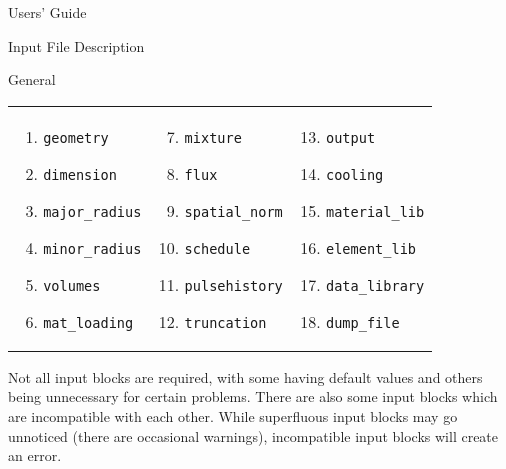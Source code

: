 \begin{chapter}{Users' Guide\label{app:user.guide}}
\begin{section}{Input File Description\label{app:user.input}}
\begin{subsection}{General}
      {
        \renewcommand{\baselinestretch}{1}\normalsize
        \noindent\begin{tabular}{p{2in}p{2in}p{2in}}
          \begin{enumerate}
          \item \texttt{geometry}
          \item \texttt{dimension}
          \item \texttt{major\_radius}
          \item \texttt{minor\_radius}
          \item \texttt{volumes}
          \item \texttt{mat\_loading}
          \end{enumerate} &
          \begin{enumerate}\setcounter{enumi}{6}
          \item \texttt{mixture}
          \item \texttt{flux}
          \item \texttt{spatial\_norm}
          \item \texttt{schedule}
          \item \texttt{pulsehistory}
          \item \texttt{truncation}
          \end{enumerate} &
          \begin{enumerate}\setcounter{enumi}{12}
          \item \texttt{output}
          \item \texttt{cooling}
          \item \texttt{material\_lib}
          \item \texttt{element\_lib}
          \item \texttt{data\_library}
          \item \texttt{dump\_file}
          \end{enumerate}
        \end{tabular}
        }

      Not all input blocks are required, with some having default
      values and others being unnecessary for certain problems.  There
      are also some input blocks which are incompatible with each
      other.  While superfluous input blocks may go unnoticed (there
      are occasional warnings), incompatible input blocks will create
      an error.
      

\end{subsection}
\end{section}
\end{chapter}
